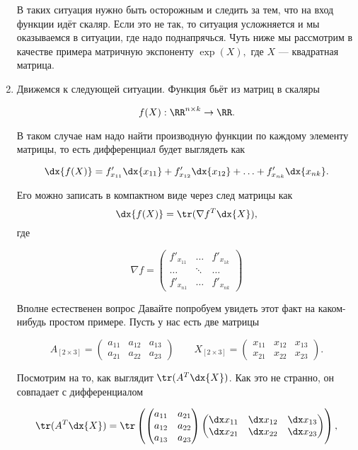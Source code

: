 \begin{sol}
\begin{enumerate}
В таких ситуация нужно быть осторожным и следить за тем, что на вход функции идёт скаляр. Если это не так, то ситуация усложняется и мы оказываемся в ситуации, где надо поднапрячься. Чуть ниже мы рассмотрим в качестве примера матричную экспоненту $\exp(X),$ где $X$ --- квадратная матрица. 


\item \label{tr_tr} Движемся к следующей ситуации. Функция бьёт из матриц в скаляры

\[
f(X) : \RR^{n \times k} \to \RR.
\]

В таком случае нам надо найти производную функции по каждому элементу матрицы, то есть дифференциал будет выглядеть как 

\[
\dx{f(X)} = f'_{x_{11}} \dx{x_{11}} + f'_{x_{12}} \dx{x_{12}} + \ldots + f'_{x_{nk}} \dx{x_{nk}}.
\]

Его можно записать в компактном виде через след матрицы как 
\[
\dx{f(X)} = \tr(\nabla f^T \dx{X}),
\] где 

\[
\nabla f = \begin{pmatrix} f'_{x_{11}} & \ldots & f'_{x_{1k}} \\ 
\hdots & \ddots & \hdots \\ 
f'_{x_{n1}} & \ldots & f'_{x_{nk}}
\end{pmatrix}
\]

Вполне естественен вопрос  Давайте попробуем увидеть этот факт на каком-нибудь простом примере. Пусть у нас есть две матрицы 

\[
A_{[2 \times 3]} = \begin{pmatrix} a_{11} & a_{12} & a_{13} \\ a_{21} & a_{22} & a_{23} \end{pmatrix} \qquad X_{[2 \times 3]} = \begin{pmatrix} x_{11} & x_{12} & x_{13} \\ x_{21} & x_{22} & x_{23} \end{pmatrix}.
\]

Посмотрим на то, как выглядит $\tr(A^T \dx{X})$. Как это не странно, он совпадает с дифференциалом 

\[\tr(A^T \dx{X}) = \tr \left( \begin{pmatrix} a_{11} & a_{21} \\ a_{12} & a_{22} \\ a_{13} &  a_{23} \end{pmatrix} \begin{pmatrix} \dx x_{11} & \dx x_{12} & \dx x_{13} \\ \dx x_{21} & \dx x_{22} & \dx x_{23} \end{pmatrix} \right),
\]


\end{enumerate}
\end{sol}
